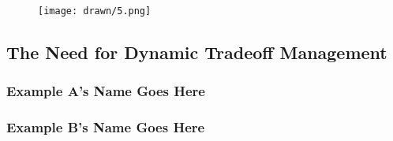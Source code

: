 \begin{figure}[ht]
 \centering
  \texttt{[image: drawn/5.png]}
   \caption{}\label{fig:energy-latency-linearity}
\end{figure}

\subsection{The Need for Dynamic Tradeoff Management}

\subsubsection{Example A's Name Goes Here}

\subsubsection{Example B's Name Goes Here}
